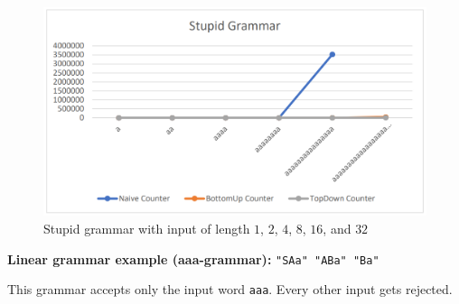 \documentclass[a4paper, 11pt]{article}
\begin{document}
\begin{figure}[H]
\begin{center}
\includegraphics[scale=0.4]{diagrams/SG_C.png}
\end{center}
\caption{Stupid grammar with input of length $1$, $2$, $4$, $8$, $16$,  and $32$}
\end{figure}





\textbf{Linear grammar example (aaa-grammar):}
\texttt{"SAa" "ABa" "Ba"}

This grammar accepts only the input word \texttt{aaa}. Every other input gets rejected.
\end{document}
